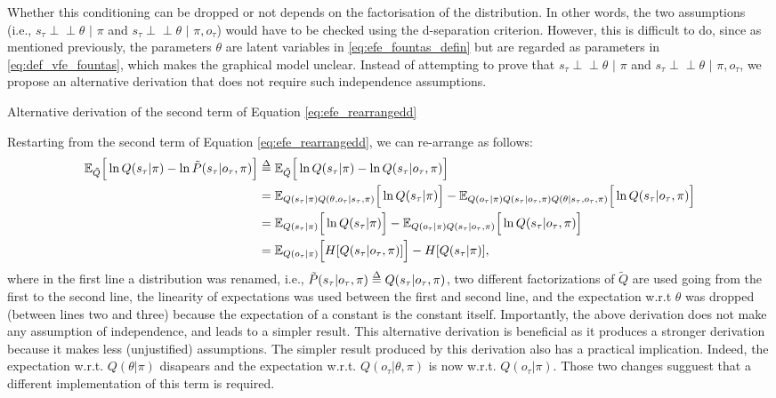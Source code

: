 \documentclass[twoside,11pt]{article}
\makeatletter
\def\delequal{\mathrel{\ensurestackMath{\stackon[1pt]{=}{\scriptstyle\Delta}}}}
\newcommand{\indep}{\perp \! \! \! \perp}
\newcounter{subsubsubsection}[subsubsection]
\def\subsubsubsection{\@startsection
     {subsubsubsection}{4}{\z@} {-3.25ex plus -1
     ex minus -.2ex}{1.5ex plus .2ex}{\normalsize\bf}}
\makeatother
\begin{document}
Whether this conditioning can be dropped or not depends on the factorisation of the distribution. In other words, the two assumptions (i.e., $s_\tau \indep \theta \,\,|\,\, \pi$ and $s_\tau \indep \theta \,\,| \,\,\pi, o_\tau$) would have to be checked using the d-separation criterion. However, this is difficult to do, since as mentioned previously, the parameters $\theta$ are latent variables in \eqref{eq:efe_fountas_defin} but are regarded as parameters in \eqref{eq:def_vfe_fountas}, which makes the graphical model unclear. Instead of attempting to prove that $s_\tau \indep \theta \,\,|\,\, \pi$ and $s_\tau \indep \theta \,\,| \,\,\pi, o_\tau$, we propose an alternative derivation that does not require such independence assumptions. 

\subsubsubsection{Alternative derivation of the second term of Equation  \eqref{eq:efe_rearrangedd}}

Restarting from the second term of Equation \eqref{eq:efe_rearrangedd}, we can  re-arrange as follows:
\begin{align*}
\mathbb{E}_{\tilde{Q}}\Big[ \ln Q(s_\tau|\pi) - \ln \tilde{P}(s_\tau|o_\tau, \pi) \Big] &\delequal \mathbb{E}_{\tilde{Q}}\Big[ \ln Q(s_\tau|\pi) - \ln Q(s_\tau|o_\tau, \pi) \Big]\\
&= \mathbb{E}_{Q(s_\tau|\pi)Q(\theta,o_\tau|s_\tau,\pi)}\Big[ \ln Q(s_\tau|\pi)\Big] - \mathbb{E}_{Q(o_\tau|\pi)Q(s_\tau|o_\tau,\pi)Q(\theta|s_\tau,o_\tau,\pi)}\Big[ \ln Q(s_\tau|o_\tau, \pi) \Big]\\
&= \mathbb{E}_{Q(s_\tau|\pi)}\Big[ \ln Q(s_\tau|\pi)\Big] - \mathbb{E}_{Q(o_\tau|\pi)Q(s_\tau|o_\tau,\pi)}\Big[ \ln Q(s_\tau|o_\tau, \pi) \Big]\\
&= \mathbb{E}_{Q(o_\tau|\pi)}\Big[ H[Q(s_\tau|o_\tau, \pi)] \Big] - H[Q(s_\tau|\pi)],
\end{align*}
where in the first line a distribution was renamed, i.e., $\tilde{P}(s_\tau|o_\tau, \pi) \delequal Q(s_\tau|o_\tau, \pi)$, two different factorizations of $\tilde{Q}$ are used going from the first to the second line, the linearity of expectations was used between the first and second line, and the expectation w.r.t $\theta$ was dropped (between lines two and three) because the expectation of a constant is the constant itself. Importantly, the above derivation does not make any assumption of independence, and leads to a simpler result. This alternative derivation is beneficial as it produces a stronger derivation because it makes less (unjustified) assumptions. The simpler result produced by this derivation also has a practical implication. Indeed, the expectation w.r.t. $Q(\theta|\pi)$ disapears and the expectation w.r.t. $Q(o_\tau|\theta,\pi)$ is now w.r.t. $Q(o_\tau|\pi)$. Those two changes sugguest that a different implementation of this term is required.
\end{document}
